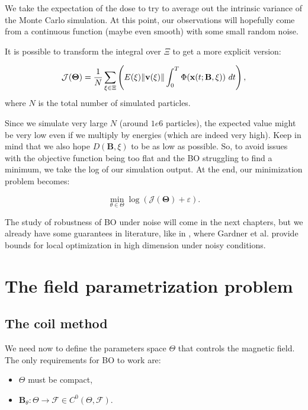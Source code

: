 \documentclass{article}
\begin{document}
	We take the expectation of the dose to try to average out the intrinsic variance of the Monte Carlo simulation. At this point, our observations will hopefully come from a continuous function (maybe even smooth) with some small random noise.
	
	It is possible to transform the integral over $\Xi$ to get a more explicit version:
	
	\begin{equation}
		\mathcal{J}(\mathbf{\Theta}) = {1 \over N} \sum_{\xi \in \Xi} \left( E(\xi) \|\mathbf{v}(\xi)\| \int_0^T \Phi(\mathbf{x}(t; \mathbf{B}, \xi)) \ dt \right),
	\end{equation}
	where $N$ is the total number of simulated particles.
	
	Since we simulate very large $N$ (around $1e6$ particles), the expected value might be very low even if we multiply by energies (which are indeed very high). Keep in mind that we also hope $D(\mathbf{B}, \xi)$ to be as low as possible. So, to avoid issues with the objective function being too flat and the BO struggling to find a minimum, we take the log of our simulation output. At the end, our minimization problem becomes:
	
	\begin{equation}
		\min_{\theta \in \Theta} \log \left( \mathcal{J}(\mathbf{\Theta}) + \varepsilon \right).
	\end{equation}
	
	The study of robustness of BO under noise will come in the next chapters, but we already have some guarantees in literature, like in \cite{boconvergence2024}, where Gardner et al. provide bounds for local optimization in high dimension under noisy conditions.
	
	\section{The field parametrization problem}
	\subsection{The coil method}
	We need now to define the parameters space $\Theta$ that controls the magnetic field. The only requirements for BO to work are:
	
	\begin{itemize}
		\item $\Theta$ must be compact,
		\item $\mathbf{B}_\theta : \Theta \rightarrow \mathcal{F} \in C^0(\Theta, \mathcal{F})$. 	
	\end{itemize}
	
\end{document}
